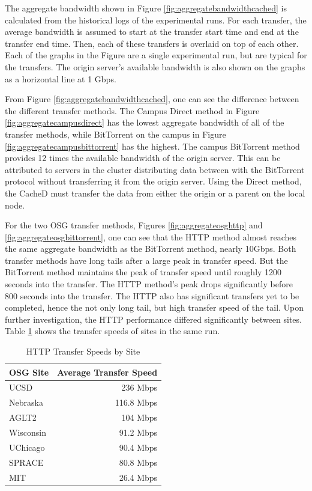 The aggregate bandwidth shown in Figure \ref{fig:aggregatebandwidthcached} is calculated from the historical logs of the experimental runs.  For each transfer, the average bandwidth is assumed to start at the transfer start time and end at the transfer end time.  Then, each of these transfers is overlaid on top of each other.  Each of the graphs in the Figure are a single experimental run, but are typical for the transfers.  The origin server's available bandwidth is also shown on the graphs as a horizontal line at 1 Gbps.

From Figure \ref{fig:aggregatebandwidthcached}, one can see the difference between the different transfer methods.  The Campus Direct method in Figure \ref{fig:aggregatecampusdirect} has the lowest aggregate bandwidth of all of the transfer methods, while BitTorrent on the campus in Figure \ref{fig:aggregatecampusbittorrent} has the highest.  The campus BitTorrent method provides 12 times the available bandwidth of the origin server.  This can be attributed to servers in the cluster distributing data between with the BitTorrent protocol without transferring it from the origin server.  Using the Direct method, the CacheD must transfer the data from either the origin or a parent on the local node.

For the two OSG transfer methods, Figures \ref{fig:aggregateosghttp} and \ref{fig:aggregateosgbittorrent}, one can see that the HTTP method almost reaches the same aggregate bandwidth as the BitTorrent method, nearly 10Gbps.  Both transfer methods have long tails after a large peak in transfer speed.  But the BitTorrent method maintains the peak of transfer speed until roughly 1200 seconds into the transfer.  The HTTP method's peak drops significantly before 800 seconds into the transfer.  The HTTP also has significant transfers yet to be completed, hence the not only long tail, but high transfer speed of the tail.  Upon further investigation, the HTTP performance differed significantly between sites.  Table \ref{tbl:transferspeedsites} shows the transfer speeds of sites in the same run.

\begin{table}[h!t]
	\centering
	\bgroup
	\def\arraystretch{1.5}
	\begin{tabular}{l|r}
\textbf{OSG Site} & \textbf{Average Transfer Speed} \\ \hline
UCSD & 236 Mbps \\ \hline
Nebraska & 116.8 Mbps \\ \hline
AGLT2 & 104 Mbps \\ \hline
Wisconsin & 91.2 Mbps \\ \hline
UChicago & 90.4 Mbps \\ \hline
SPRACE & 80.8 Mbps \\ \hline
MIT & 26.4 Mbps \\ \hline
	\end{tabular}
	\egroup
	\caption{HTTP Transfer Speeds by Site}
	\label{tbl:transferspeedsites}
\end{table}

